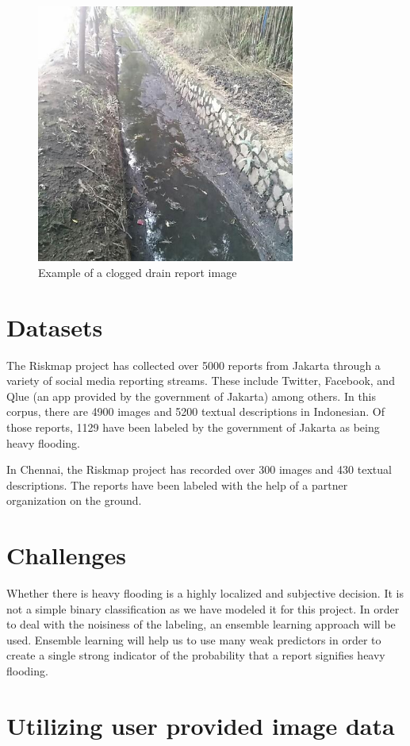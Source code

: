 \begin{figure}[ht]
\includegraphics[width = 85mm]{clogged_drain.jpeg}
\caption{Example of a clogged drain report image}
\label{fig:clogged_drain}
\end{figure}

\section{Datasets}
The Riskmap project has collected over 5000 reports from Jakarta through a 
variety of social media reporting streams. These include Twitter, Facebook, and 
Qlue (an app provided by the government of Jakarta) among others. In this corpus, 
there are 4900 images and 5200 textual descriptions in Indonesian. Of those reports, 
1129 have been labeled by the government of Jakarta as being heavy flooding.

In Chennai, the Riskmap project has recorded over 300 images and 430 textual descriptions. 
The reports have been labeled with the help of a partner organization on the ground.

\section{Challenges}
Whether there is heavy flooding is a highly localized and subjective decision. It is 
not a simple binary classification as we have modeled it for this project. In 
order to deal with the noisiness of the labeling, an ensemble learning approach 
will be used\cite{ensemble}. Ensemble learning will help us to use many weak 
predictors in order to create a single strong indicator of the probability that 
a report signifies heavy flooding.

\section{Utilizing user provided image data}



